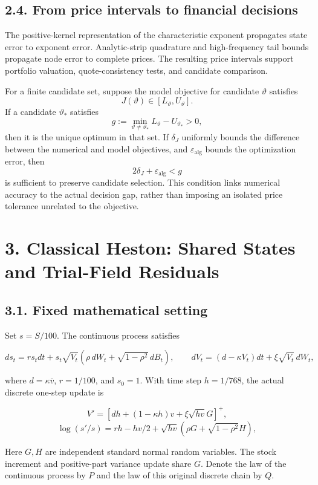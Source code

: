 \documentclass[a4paper,11pt]{article}
\begin{document}
\subsection*{2.4. From price intervals to financial decisions}

The positive-kernel representation of the characteristic exponent propagates state error to exponent error. Analytic-strip quadrature and high-frequency tail bounds propagate node error to complete prices. The resulting price intervals support portfolio valuation, quote-consistency tests, and candidate comparison.

For a finite candidate set, suppose the model objective for candidate \(\vartheta\) satisfies
\[
J(\vartheta)\in[L_\vartheta,U_\vartheta].
\]
If a candidate \(\vartheta_*\) satisfies
\[
g:=\min_{\vartheta\ne\vartheta_*}L_\vartheta-U_{\vartheta_*}>0,
\]
then it is the unique optimum in that set. If \(\delta_J\) uniformly bounds the difference between the numerical and model objectives, and \(\varepsilon_{\mathrm{alg}}\) bounds the optimization error, then
\[
2\delta_J+\varepsilon_{\mathrm{alg}}<g
\]
is sufficient to preserve candidate selection. This condition links numerical accuracy to the actual decision gap, rather than imposing an isolated price tolerance unrelated to the objective.

\section*{3. Classical Heston: Shared States and Trial-Field Residuals}

\subsection*{3.1. Fixed mathematical setting}

Set $s=S/100$. The continuous process satisfies

\[
ds_t=rs_tdt+s_t\sqrt{V_t}(\rho\,dW_t+\sqrt{1-\rho^2}\,dB_t),
\qquad dV_t=(d-\kappa V_t)dt+\xi\sqrt{V_t}\,dW_t,
\]

where $d=\kappa\bar v$, $r=1/100$, and $s_0=1$. With time step $h=1/768$, the actual discrete one-step update is

\[
V'=[dh+(1-\kappa h)v+\xi\sqrt{hv}G]^+,
\]
\[
\log(s'/s)=rh-hv/2+\sqrt{hv}(\rho G+\sqrt{1-\rho^2}H),
\]

Here $G,H$ are independent standard normal random variables. The stock increment and positive-part variance update share $G$. Denote the law of the continuous process by $P$ and the law of this original discrete chain by $Q$.
\end{document}
